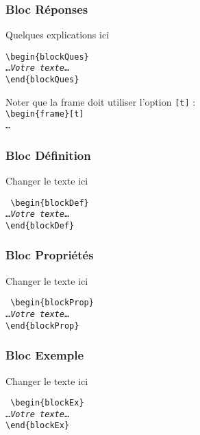\documentclass[t,aspectratio=169]{beamer}
\begin{document}
\begin{frame}[t]
\frametitle{Bloc \og Réponses\fg}
\begin{blockRep}
    Quelques explications ici
\end{blockRep}
\noindent\texttt{\textbackslash begin\{blockQues\}\\
\ldots\emph{Votre texte}\ldots\\
\textbackslash end\{blockQues\}
}%

Noter que la frame doit utiliser l'option \texttt{[t]} :\\

\noindent\texttt{\textbackslash begin\{frame\}[t]\\ 
    \ldots\\
}%
\end{frame}
\begin{frame}
\frametitle{Bloc \og Définition\fg}
\begin{blockDef}
Changer le texte ici
\end{blockDef}
\noindent\texttt{%
\textbackslash begin\{blockDef\}\\
\ldots\emph{Votre texte}\ldots\\
\textbackslash end\{blockDef\}
}%
\end{frame}
\begin{frame}
    \frametitle{Bloc \og Propriétés\fg}
    \begin{blockProp}
        Changer le texte ici
    \end{blockProp}
\noindent\texttt{%
\textbackslash begin\{blockProp\}\\
\ldots\emph{Votre texte}\ldots\\
\textbackslash end\{blockProp\}
}%
\end{frame}
\begin{frame}
\frametitle{Bloc \og Exemple\fg}
\begin{blockEx}
Changer le texte ici
\end{blockEx}
\noindent\texttt{%
\textbackslash begin\{blockEx\}\\
\ldots\emph{Votre texte}\ldots\\
\textbackslash end\{blockEx\}
}%
\end{frame}
\end{document}
